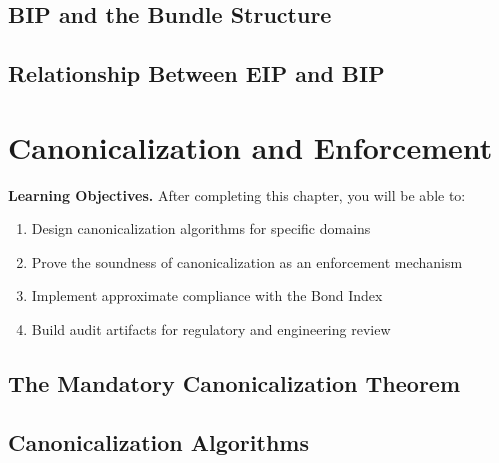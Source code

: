 \documentclass[12pt,letterpaper,twoside,openright]{book}
\theoremstyle{plain}
\theoremstyle{definition}
\theoremstyle{remark}
\begin{document}
\section{BIP and the Bundle Structure}

\section{Relationship Between EIP and BIP}


\chapter{Canonicalization and Enforcement}
\label{ch:canonicalization}

\begin{framed}
\noindent\textbf{Learning Objectives.} After completing this chapter, you will be able to:
\begin{enumerate}
    \item Design canonicalization algorithms for specific domains
    \item Prove the soundness of canonicalization as an enforcement mechanism
    \item Implement approximate compliance with the Bond Index
    \item Build audit artifacts for regulatory and engineering review
\end{enumerate}
\end{framed}

\section{The Mandatory Canonicalization Theorem}

\section{Canonicalization Algorithms}
\end{document}
